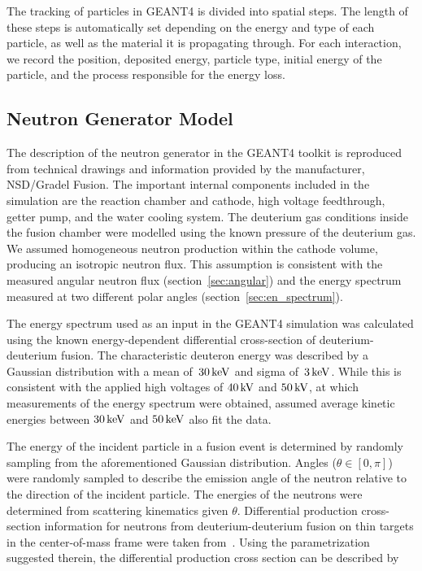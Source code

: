 The tracking of particles in GEANT4 is divided into spatial steps. The length of these steps is automatically set depending on the energy and type of each particle, as well as the material it is propagating through. For each interaction, we record the position, deposited energy, particle type, initial energy of the particle, and the process responsible for the energy loss.

\subsection{Neutron Generator Model}\label{sec:initialneutronspectrum}

The description of the neutron generator in the GEANT4 toolkit is reproduced from technical drawings and information provided by the manufacturer, NSD/Gradel Fusion. The important internal components included in the simulation are the reaction chamber and cathode, high voltage feedthrough, getter pump, and the water cooling system. The deuterium gas conditions inside the fusion chamber were modelled using the known pressure of the deuterium gas. We assumed homogeneous neutron production within the cathode volume, producing an isotropic neutron flux. This assumption is consistent with the measured angular neutron flux (section~\ref{sec:angular}) and the energy spectrum measured at two different polar angles (section~\ref{sec:en_spectrum}).

The energy spectrum used as an input in the GEANT4 simulation was calculated using the known energy-dependent differential cross-section of deuterium-deuterium fusion. The characteristic deuteron energy was described by a Gaussian distribution with a mean of~$30\,\mathrm{keV}$ and sigma of~$3\,\mathrm{keV}$. While this is consistent with the applied high voltages of $40\,\mathrm{kV}$ and $50\,\mathrm{kV}$, at which measurements of the energy spectrum were obtained, assumed average kinetic energies between $30\,\mathrm{keV}$ and $50\,\mathrm{keV}$ also fit the data.

The energy of the incident particle in a fusion event is determined by randomly sampling from the aforementioned Gaussian distribution. Angles ($\theta \in [0, \pi]$) were randomly sampled to describe the emission angle of the neutron relative to the direction of the incident particle. The energies of the neutrons were determined from scattering kinematics given $\theta$. Differential production cross-section information for neutrons from deuterium-deuterium fusion on thin targets in the center-of-mass frame were taken from~\cite{Liskien:1973}. Using the parametrization suggested therein, the differential production cross section can be described by

